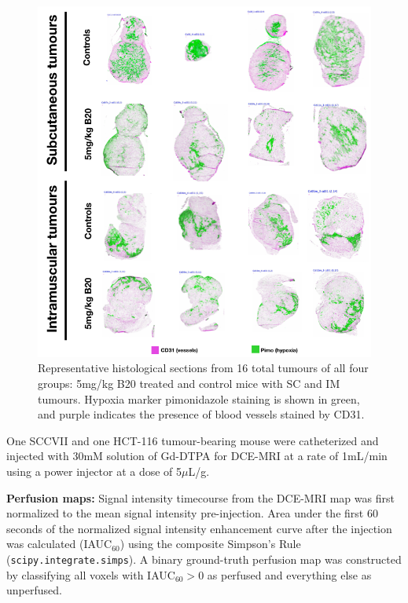 \begin{figure}[htbp]
   \centering
   \includegraphics[width=\textwidth]{oemri_thesis3/oemri_thesis3-images/5_oep8_imsc_histo.png} %
   \caption{Representative histological sections from 16 total tumours of all four groups: 5mg/kg B20 treated and control mice with SC and IM tumours.
   Hypoxia marker pimonidazole staining is shown in green, and purple indicates the presence of blood vessels stained by CD31.}
   \label{allHisto}
\end{figure}


One SCCVII and one HCT-116 tumour-bearing mouse were catheterized and injected with 30mM solution of Gd-DTPA for DCE-MRI at a rate of 1mL/min using a power injector at a dose of 5$\mu$L/g.


\noindent\textbf{Perfusion maps:} Signal intensity timecourse from the DCE-MRI map was first normalized to the mean signal intensity pre-injection.
Area under the first 60 seconds of the normalized signal intensity enhancement curve after the injection was calculated (IAUC$_{60}$) using the composite Simpson's Rule (\texttt{scipy.integrate.simps}).
A binary ground-truth perfusion map was constructed by classifying all voxels with IAUC$_{60} > 0$ as perfused and everything else as unperfused.





